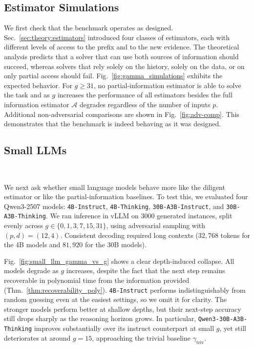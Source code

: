 \documentclass{article}
\begin{document}
\subsection{Estimator Simulations}


We first check that the benchmark operates as designed. Sec.~\ref{sec:theory:estimators} introduced four classes of estimators, each with different levels of access to the prefix and to the new evidence. The theoretical analysis predicts that a solver that can use both sources of information should succeed, whereas solvers that rely solely on the history, solely on the data, or on only partial access should fail. Fig.~\ref{fig:gamma_simulations} exhibits the expected behavior. For $g \ge 31$, no partial-information estimator is able to solve the task and as $g$ increases the performance of all estimators besides the full information estimator $\mathcal{A}$ degrades regardless of the number of inputs $p$. Additional non-adversarial comparisons are shown in Fig.~\ref{fig:adv-comp}. This demonstrates that the benchmark is indeed behaving as it was designed.

\subsection{Small LLMs}~\label{sec:results:small}


We next ask whether small language models behave more like the diligent estimator or like the partial-information baselines. To test this, we evaluated four Qwen3-2507 models: \texttt{4B-Instruct}, \texttt{4B-Thinking}, \texttt{30B-A3B-Instruct}, and \texttt{30B-A3B-Thinking}. We ran inference in vLLM on $3000$ generated instances, split evenly across $g\in\{0,1,3,7,15,31\}$, using adversarial sampling with $(p,d)=(12,4)$. Consistent decoding required long contexts ($32{,}768$ tokens for the 4B models and $81{,}920$ for the 30B models).

Fig.~\ref{fig:small_llm_gamma_vs_g} shows a clear depth-induced collapse. All models degrade as $g$ increases, despite the fact that the next step remains recoverable in polynomial time from the information provided (Thm.~\ref{thm:recoverability_poly}). \texttt{4B-Instruct} performs indistinguishably from random guessing even at the easiest settings, so we omit it for clarity. The stronger models perform better at shallow depths, but their next-step accuracy still drops sharply as the reasoning horizon grows. In particular, \texttt{Qwen3-30B-A3B-Thinking} improves substantially over its instruct counterpart at small $g$, yet still deteriorates at around $g=15$, approaching the trivial baseline $\gamma_{\mathrm{triv}}$.
\end{document}
